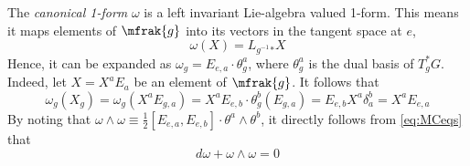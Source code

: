 \documentclass[10pt,reqno]{amsart}
\numberwithin{equation}{section}
\begin{document}
The \emph{canonical 1-form} $\omega$ is a left invariant 
Lie-algebra valued 1-form. This means it maps elements of 
$\mfrak{g}$ into its vectors in the tangent space at $e$,
%
\begin{equation}
	\omega(X) = L_{g^{-1}}{}_\ast X
\end{equation}
%
Hence, it can be expanded as $\omega_g = E_{e,a}\cdot\theta^a_g$, 
where $\theta^a_g$ is the dual basis of $T^\ast_g G$. Indeed, let 
$X = X^a E_a$ be an element of $\mfrak{g}$. It follows that
%
\begin{displaymath}
	\omega_g(X_g) = \omega_g(X^a E_{g,a}) = X^a E_{e,b} \cdot 
	\theta^b_{g}(E_{g,a}) = E_{e,b}X^a \delta^b_a = X^a E_{e,a}
\end{displaymath}
%
By noting that $\omega \wedge \omega \equiv \tfrac{1}{2} 
[E_{e,a}, E_{e,b}] \cdot \theta^a \wedge \theta^b$, it directly 
follows from \eqref{eq:MCeqs} that
%
\begin{equation}\label{eq:MCeqsCanForm}
	d\omega + \omega \wedge \omega = 0
\end{equation}
%
\end{document}
